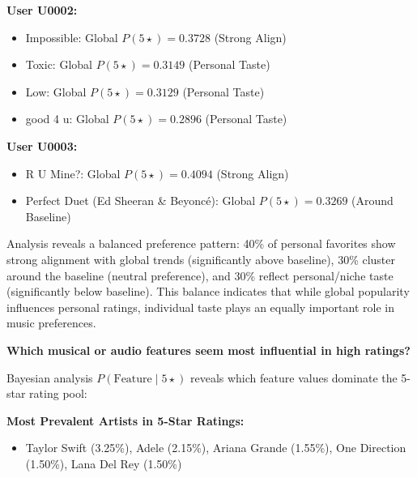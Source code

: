 \documentclass[12pt,a4paper]{article}
\begin{document}
\textbf{User U0002:}
\begin{itemize}
    \item Impossible: Global $P(5\star) = 0.3728$ (Strong Align)
    \item Toxic: Global $P(5\star) = 0.3149$ (Personal Taste)
    \item Low: Global $P(5\star) = 0.3129$ (Personal Taste)
    \item good 4 u: Global $P(5\star) = 0.2896$ (Personal Taste)
\end{itemize}

\textbf{User U0003:}
\begin{itemize}
    \item R U Mine?: Global $P(5\star) = 0.4094$ (Strong Align)
    \item Perfect Duet (Ed Sheeran \& Beyoncé): Global $P(5\star) = 0.3269$ (Around Baseline)
\end{itemize}

Analysis reveals a balanced preference pattern: 40\% of personal favorites show strong alignment with global trends (significantly above baseline), 30\% cluster around the baseline (neutral preference), and 30\% reflect personal/niche taste (significantly below baseline). This balance indicates that while global popularity influences personal ratings, individual taste plays an equally important role in music preferences.

\textbf{Which musical or audio features seem most influential in high ratings?}

Bayesian analysis $P(\text{Feature} \mid 5\star)$ reveals which feature values dominate the 5-star rating pool:

\textbf{Most Prevalent Artists in 5-Star Ratings:}
\begin{itemize}
    \item Taylor Swift (3.25\%), Adele (2.15\%), Ariana Grande (1.55\%), One Direction (1.50\%), Lana Del Rey (1.50\%)
\end{itemize}
\end{document}
